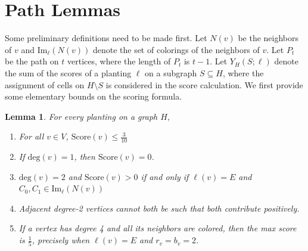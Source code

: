 \documentclass[11pt]{article}
\theoremstyle{plain}
\newtheorem{lemma}[theorem]{Lemma}
\begin{document}
\section{Path Lemmas}

Some preliminary definitions need to be made first. 
Let $N(v)$ be the neighbors of $v$ and $\mathrm{Im}_{\ell}(N(v))$ denote the set of colorings of the neighbors of $v$. 
Let $P_t$ be the path on $t$ vertices, where the length of $P_t$ is $t-1$. Let $Y_H(S; \ell)$ denote the sum of the scores of a planting $\ell$ on a subgraph $S \subseteq H$, where the assignment of cells on $H \setminus S$ is considered in the score calculation. We first provide some elementary bounds on the scoring formula.

\begin{lemma} \label{lem:elementarybounds}
For every planting on a graph $H$,
    \begin{enumerate}
        \item For all $v \in V$, $\mathrm{Score}(v) \leq \frac{3}{10}$
        \item If $\mathrm{deg}(v) = 1$, then $\mathrm{Score}(v) = 0$.
        \item $\mathrm{deg}(v) = 2$ and $\mathrm{Score}(v) > 0$ if and only if $\ell(v) = E$ and $C_0, C_1 \in \mathrm{Im}_\ell (N(v))$
        \item Adjacent degree-2 vertices cannot both be such that both contribute positively.
        \item If a vertex has degree 4 and all its neighbors are colored, then the max score is $\frac{1}{5}$, precisely when $\ell(v)=E$ and $r_v=b_v=2$.
    \end{enumerate}
\end{lemma}
\end{document}
